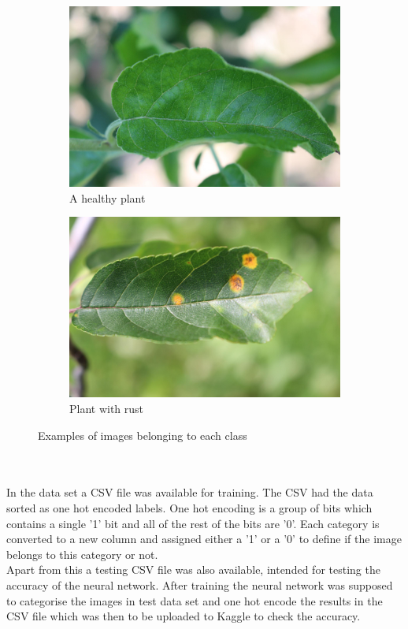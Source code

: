 \documentclass[10pt,twocolumn,letterpaper]{article}
\begin{document}
\begin{figure}
\begin{subfigure}{.22\textwidth}
  \centering
  \includegraphics[scale= 0.05]{images/healthy.jpg}  
  \caption{A healthy plant}
  \label{fig:sub-third}
\end{subfigure}
\begin{subfigure}{.22\textwidth}
  \centering
  \includegraphics[scale= 0.05]{images/rust.jpg}  
  \caption{Plant with rust}
  \label{fig:sub-fourth}
\end{subfigure}
\caption{Examples of images belonging to each class}
\label{fig:fig}
\end{figure}\\
\\
In the data set a CSV file was available for training. The CSV had the data sorted as one hot encoded labels.
One hot encoding is a group of bits which contains a single '1' bit and all of the rest of the bits are '0'. Each category is converted to a new column and assigned either a '1' or a '0' to define if the image belongs to this category or not.\\
Apart from this a testing CSV file was also available, intended for testing the accuracy of the neural network. After training the neural network was supposed to categorise the images in test data set and one hot encode the results in the CSV file which was then to be uploaded to Kaggle to check the accuracy.    
\end{document}
